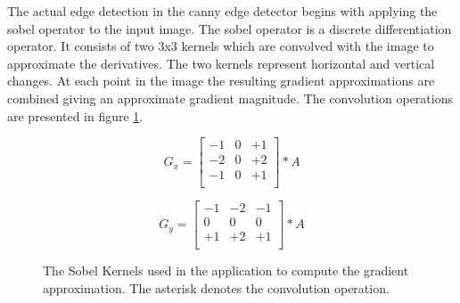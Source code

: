 The actual edge detection in the canny edge detector begins with applying the sobel operator to the input image. The sobel operator is a discrete differentiation operator. It consists of two 3x3 kernels which are convolved with the image to approximate the derivatives. The two kernels represent horizontal and vertical changes. At each point in the image the resulting gradient approximations are combined giving an approximate gradient magnitude. \cite{gonzalez2008digital} The convolution operations are presented in figure \ref{fig:sobelmat}.

\begin{figure}
    \begin{displaymath}
        G_{x} = \begin{bmatrix}
            -1 & 0 & +1 \\
            -2 & 0 & +2 \\
            -1 & 0 & +1 \\
        \end{bmatrix} \ast A
    \end{displaymath}

    \begin{displaymath}
        G_{y} = \begin{bmatrix}
            -1 & -2 & -1 \\
            0 & 0 & 0 \\
            +1 & +2 & +1 \\
        \end{bmatrix} \ast A
    \end{displaymath}
    \caption{The Sobel Kernels used in the application to compute the gradient approximation. The asterisk denotes the convolution operation. }
    \label{fig:sobelmat}
\end{figure}
